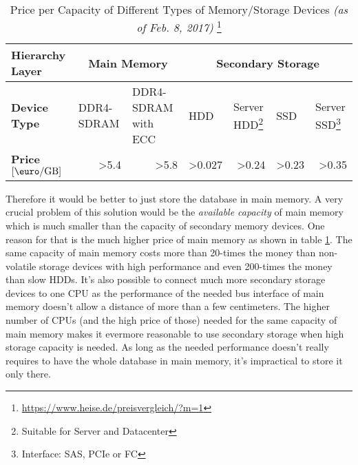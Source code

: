 \begin{@empty}
    \begin{table}[h]
        \centering
        \begin{minipage}{\linewidth}
            \footnotesize
            \begin{tabular}{|m{}|m{}|m{}|m{}|m{}|m{}|m{}|}
				\hline
				\textbf{Hierarchy Layer} 							& \multicolumn{2}{c|}{\textbf{Main Memory}}							& \multicolumn{4}{c|}{\textbf{Secondary Storage}}	\\ \hline
				\textbf{Device Type}     							& \centering DDR4-SDRAM		& \centering DDR4-SDRAM with ECC		& \centering HDD																													& \centering Server HDD\footnote{Suitable for Server and Datacenter}		& \centering SSD					& \centering Server SSD\footnote{Interface: SAS, PCIe or FC}	\\ \hline
				\textbf{Price $\left[\si{\euro\per\giga\byte}\right]$}    	& \multicolumn{1}{r|}{\num{>5.4}}	& \multicolumn{1}{r|}{\num{>5.8}}		& \multicolumn{1}{r|}{\num{>0.027}}																								& \multicolumn{1}{r|}{\num{>0.24}}						& \multicolumn{1}{r|}{\num{>0.23}}	& \multicolumn{1}{r|}{\num{>0.35}}	\\ \hline
            \end{tabular}
        \end{minipage}
        \caption[Price per Capacity of Different Types of Memory/Storage]{Price per Capacity of Different Types of Memory/Storage Devices \textit{(as of Feb. 8, 2017)} \footnote{\url{https://www.heise.de/preisvergleich/?m=1}}} \label{tab:memorystorageprices}
    \end{table}
\end{@empty}

    Therefore it would be better to just store the database in main memory. A very crucial problem of this solution would be the \emph{available capacity} of main memory which is much smaller than the capacity of secondary memory devices. One reason for that is the much higher price of main memory as shown in table \ref{tab:memorystorageprices}. The same capacity of main memory costs more than 20-times the money than non-volatile storage devices with high performance and even 200-times the money than slow HDDs. It's also possible to connect much more secondary storage devices to one CPU as the performance of the needed bus interface of main memory doesn't allow a distance of more than a few centimeters. The higher number of CPUs (and the high price of those) needed for the same capacity of main memory makes it evermore reasonable to use secondary storage when high storage capacity is needed. As long as the needed performance doesn't really requires to have the whole database in main memory, it's impractical to store it only there.

